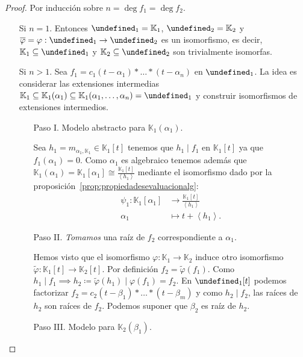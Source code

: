 \documentclass[10pt, spanish]{report}
\theoremstyle{definition}
\theoremstyle{custom}
\theoremstyle{remark}
\newcommand{\K}{\mathbb{K}}
\let\L\undefined
\newcommand{\L}{\mathbb{L}}
\begin{document}
\begin{proof}
    Por inducción sobre $n=\deg{f_1}=\deg{f_2}$.
    \begin{itemize}[itemindent=30pt]
        \item[Si $n=1$.] Entonces $\L_1=\K_1$, $\L_2=\K_2$ y
            $\overline{\varphi}=\varphi:\L_1\to\L_2$ es un isomorfismo, es
            decir, $\K_1\subseteq\L_1$ y $\K_2\subseteq\L_2$ son trivialmente
            isomorfas.
        \item[Si $n>1$.] Sea $f_1=c_1(t-\alpha_1)*\ldots*(t-\alpha_n)$ en
            $\L_1$. La idea es considerar las extensiones intermedias
            $\K_1\subseteq\K_1(\alpha_1)\subseteq\K_1(\alpha_1,\ldots,\alpha_n)=\L_1$
            y construir isomorfismos de extensiones intermedios.
            \begin{enumerate}[itemindent=24pt]
                \item[Paso I.] Modelo abstracto para $\K_1(\alpha_1)$.

                    Sea $h_1=m_{\alpha_1,\K_1}\in\K_1[t]$ tenemos que
                    $h_1\mid f_1$ en $\K_1[t]$ ya que $f_1(\alpha_1)=0$.
                    Como $\alpha_1$ es algebraico tenemos además que
                    $\K_1(\alpha_1)=\K_1[\alpha_1]\cong
                    \frac{\K_1[t]}{\left<h_1\right>}$ mediante el isomorfismo
                    dado por la proposición~\ref{prop:propiedadesevaluacionalg}:
                    \begin{align*}
                        \psi_1: \K_1[\alpha_1]&\to \frac{\K_1[t]}{\left< h_1
                        \right>}\\
                            \alpha_1&\mapsto t+\left<h_1\right>.
                    \end{align*}
                \item[Paso II.] \textit{Tomamos} una raíz de $f_2$
                    correspondiente a $\alpha_1$.

                    Hemos visto que el isomorfismo $\varphi:\K_1\to \K_2$ induce
                    otro isomorfismo $\tilde{\varphi}:\K_1[t]\to\K_2[t]$. Por
                    definición $f_2=\tilde{\varphi}(f_1)$. Como $h_1\mid
                    f_1\implies
                    h_2\coloneqq\tilde{\varphi}(h_1)\mid\varphi(f_1)=f_2$. En
                    $\L_1[t]$ podemos factorizar
                    $f_2=c_2(t-\beta_1)*\ldots*(t-\beta_m)$ y como $h_2\mid
                    f_2$, las raíces de $h_2$ son raíces de $f_2$. Podemos
                    suponer que $\beta_2$ es raíz de $h_2$.
                \item[Paso III.] Modelo para $\K_2(\beta_1)$.


\end{enumerate}
\end{itemize}
\end{proof}
\end{document}
